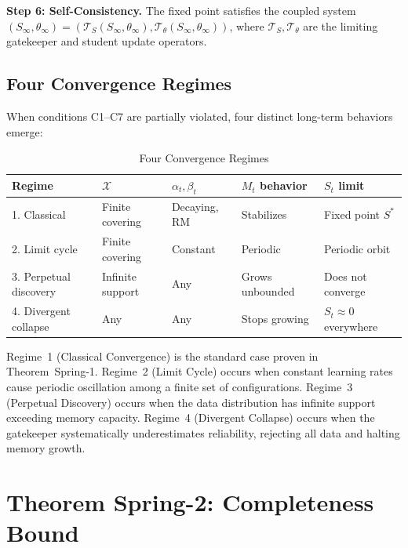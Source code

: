 \documentclass[11pt,a4paper]{article}
\theoremstyle{plain}
\theoremstyle{definition}
\theoremstyle{remark}
\newcommand{\X}{\mathcal{X}}
\begin{document}
\textbf{Step 6: Self-Consistency.} The fixed point satisfies the coupled system $(S_\infty, \theta_\infty) = (\mathcal{T}_S(S_\infty, \theta_\infty), \mathcal{T}_\theta(S_\infty, \theta_\infty))$, where $\mathcal{T}_S, \mathcal{T}_\theta$ are the limiting gatekeeper and student update operators.

\subsection{Four Convergence Regimes}

When conditions C1--C7 are partially violated, four distinct long-term behaviors emerge:

\begin{table}[ht]
\centering
\caption{Four Convergence Regimes}
\label{tab:regimes}
\begin{tabular}{@{}lllll@{}}
\toprule
Regime & $\X$ & $\alpha_t, \beta_t$ & $M_t$ behavior & $S_t$ limit \\
\midrule
1. Classical & Finite covering & Decaying, RM & Stabilizes & Fixed point $S^*$ \\
2. Limit cycle & Finite covering & Constant & Periodic & Periodic orbit \\
3. Perpetual discovery & Infinite support & Any & Grows unbounded & Does not converge \\
4. Divergent collapse & Any & Any & Stops growing & $S_t \approx 0$ everywhere \\
\bottomrule
\end{tabular}
\end{table}

Regime~1 (Classical Convergence) is the standard case proven in Theorem~Spring-1. Regime~2 (Limit Cycle) occurs when constant learning rates cause periodic oscillation among a finite set of configurations. Regime~3 (Perpetual Discovery) occurs when the data distribution has infinite support exceeding memory capacity. Regime~4 (Divergent Collapse) occurs when the gatekeeper systematically underestimates reliability, rejecting all data and halting memory growth.

\section{Theorem Spring-2: Completeness Bound}
\end{document}
